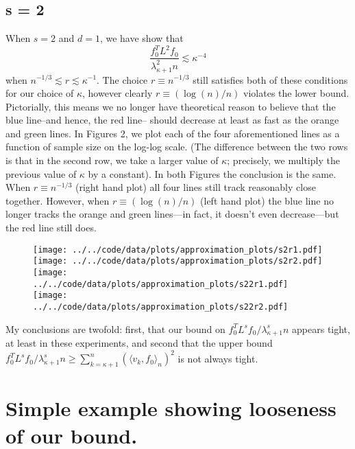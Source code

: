 \documentclass{article}
\newcommand{\1}{\mathbf{1}}
\newcommand{\dotp}[2]{\langle #1, #2 \rangle}
\theoremstyle{alden}
\theoremstyle{aldenthm}
\theoremstyle{definition}
\theoremstyle{remark}
\begin{document}
\subsection{s = 2}

When $s = 2$ and $d = 1$, we have show that
\begin{equation*}
\frac{f_0^T L^2 f_0}{\lambda_{\kappa + 1}^2 n} \lesssim \kappa^{-4}
\end{equation*}
when $n^{-1/3} \lesssim r \lesssim \kappa^{-1}$. The choice $r \equiv n^{-1/3}$ still satisfies both of these conditions for our choice of $\kappa$, however clearly $r \equiv (\log(n)/n)$ violates the lower bound. Pictorially, this means we no longer have theoretical reason to believe that the blue line--and hence, the red line-- should decrease at least as fast as the orange and green lines. In Figures 2, we plot each of the four aforementioned lines as a function of sample size on the log-log scale. (The difference between the two rows is that in the second row, we take a larger value of $\kappa$; precisely, we multiply the previous value of $\kappa$ by a constant). In both Figures the conclusion is the same. When $r \equiv n^{-1/3}$ (right hand plot) all four lines still track reasonably close together. However, when $r \equiv (\log(n)/n)$ (left hand plot) the blue line no longer tracks the orange and green lines---in fact, it doesn't even decrease---but the red line still does. 

\begin{figure}[!ht]
	\centering
	\texttt{[image: ../../code/data/plots/approximation\_plots/s2r1.pdf]}
	\texttt{[image: ../../code/data/plots/approximation\_plots/s2r2.pdf]}
	\texttt{[image: ../../code/data/plots/approximation\_plots/s22r1.pdf]}
	\texttt{[image: ../../code/data/plots/approximation\_plots/s22r2.pdf]}
\end{figure}

My conclusions are twofold: first, that our bound on $f_0^T L^s f_0/\lambda_{\kappa + 1}^s n$ appears tight, at least in these experiments, and second that the upper bound $f_0^T L^s f_0/\lambda_{\kappa + 1}^s n \geq \sum_{k = \kappa + 1}^{n} (\dotp{v_k}{f_0}_n)^2$ is not always tight. 

\section{Simple example showing looseness of our bound.}
\end{document}
